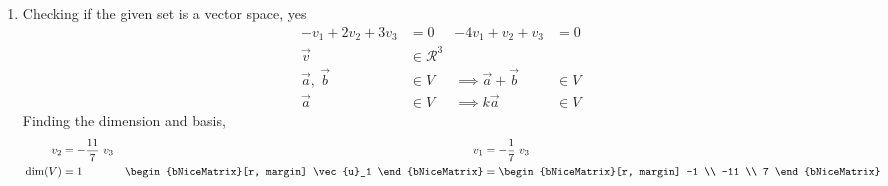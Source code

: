 \begin{enumerate}
    \item Checking if the given set is a vector space, \textcolor{y_h}{yes}
          \begin{align}
              -v_1 + 2v_2 + 3v_3         & = 0               &
              -4v_1 + v_2 + v_3          & = 0                 \\
              \vec{v}                    & \in \mathcal{R}^3   \\
              \vec{a},\ \vec{b}          & \in V             &
              \implies \vec{a} + \vec{b} & \in V               \\
              \vec{a}                    & \in V             &
              \implies k\vec{a}          & \in V
          \end{align}
          Finding the dimension and basis,
          \begin{align}
              v_2                            & = -\frac{11}{7}\ v_3             &
              v_1                            & = -\frac{1}{7}\ v_3                \\
              \dim(V)                        & = 1                              &
              \begin{bNiceMatrix}[r, margin]
                  \vec{u}_1
              \end{bNiceMatrix} & = \begin{bNiceMatrix}[r, margin]
                                        -1 \\ -11 \\ 7
                                    \end{bNiceMatrix}
          \end{align}


\end{enumerate}
